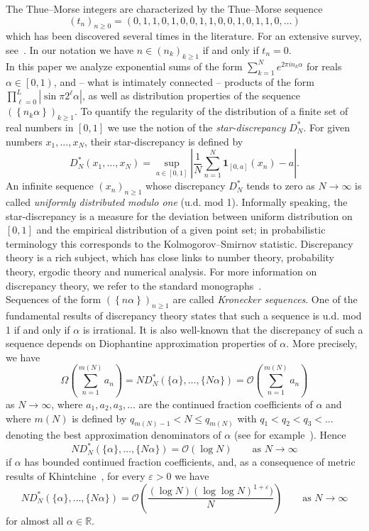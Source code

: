 \documentclass[12pt]{amsart}
\newcommand {\ve} {\varepsilon}
\begin{document}
The Thue--Morse integers are characterized by the Thue--Morse sequence 
$$
\left(t_{n}\right)_{n \geq 0} = \left(0,1,1,0,1,0,0,1,1,0,0,1,0,1,1,0,\ldots\right)
$$
which has been discovered several times in the literature. For an extensive survey, see~\cite{Shallit}. In our notation we have $n \in (n_k)_{k\geq1}$ if and only if $t_{n}=0.$\\

In this paper we analyze exponential sums of the form $\sum^{N}_{k=1} e^{2 \pi i n_{k} \alpha}$ for reals $\alpha \in \left[\left.0,1\right)\right.$, and -- what is intimately connected -- products of the form $\prod^{L}_{\ell=0} \left|\sin \pi 2^{\ell} \alpha\right|$, as well as distribution properties of the sequence $\left(\left\{n_{k} \alpha\right\}\right)_{k \geq 1}$. To quantify the regularity of the distribution of a finite set of real numbers in $[0,1]$ we use the notion of the \emph{star-discrepancy} $D_N^*$. For given numbers $x_1, \dots, x_N$, their star-discrepancy is defined by
$$
D_N^* (x_1, \dots, x_N) = \sup_{a \in [0,1]} \left| \frac{1}{N} \sum_{n=1}^N \mathbf{1}_{[0,a]} (x_n) - a \right|.
$$
An infinite sequence $(x_n)_{n \geq 1}$ whose discrepancy $D_N^*$ tends to zero as $N \to \infty$ is called \emph{uniformly distributed modulo one} (u.d. mod 1). Informally speaking, the star-discrepancy is a measure for the deviation between uniform distribution on $[0,1]$ and the empirical distribution of a given point set; in probabilistic terminology this corresponds to the Kolmogorov--Smirnov statistic. Discrepancy theory is a rich subject, which has close links to number theory, probability theory, ergodic theory and numerical analysis. For more information on discrepancy theory, we refer to the standard monographs~\cite{dts,knu}.\\

Sequences of the form $\left(\left\{n \alpha\right\}\right)_{n \geq 1}$ are called \emph{Kronecker sequences}. One of the fundamental results of discrepancy theory states that such a sequence is u.d. mod 1 if and only if $\alpha$ is irrational. It is also well-known that the discrepancy of such a sequence depends on Diophantine approximation properties of $\alpha$. More precisely, we have
$$
\Omega \left(\sum^{m(N)}_{n=1} a_{n}\right) = N D^{*}_{N} (\{\alpha\}, \dots, \{N \alpha\}) = \mathcal{O}\left(\sum^{m(N)}_{n=1} a_{n}\right)
$$
as $N \to \infty$, where $a_{1}, a_{2}, a_{3}, \ldots$ are the continued fraction coefficients of $\alpha$ and where $m(N)$ is defined by $q_{m(N)-1} < N \leq q_{m(N)}$ with $q_{1}<q_{2}<q_{3}< \ldots$ denoting the best approximation denominators of $\alpha$ (see for example~\cite[Corollary~1.64]{dts}). Hence 
$$
N D^{*}_{N} (\{\alpha\}, \dots, \{N \alpha\}) = \mathcal{O} \left(\log N\right) \qquad \textrm{as $N \to \infty$}
$$ 
if $\alpha$ has bounded continued fraction coefficients, and, as a consequence of metric results of Khintchine~\cite{khin}, for every $\ve > 0$ we have
$$
N D^{*}_{N} (\{\alpha\}, \dots, \{N \alpha\}) = \mathcal{O} \left( \frac{(\log N) (\log \log N)^{1+\ve})}{N} \right) \qquad \textrm{as $N \to \infty$}
$$ 
for almost all $\alpha \in \mathbb{R}$.\\\\
\end{document}
